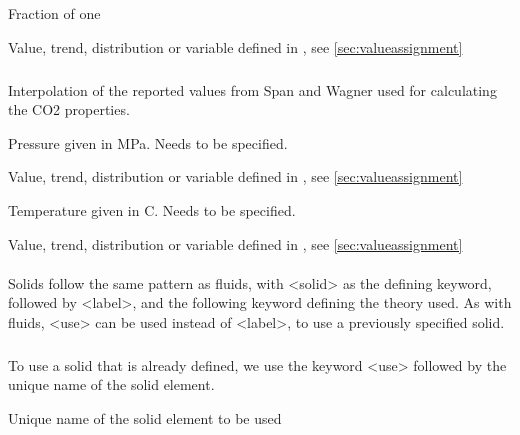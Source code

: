 {
 \slist
   \item \Description Fraction of one
   \item \Argument Value, trend, distribution or variable defined in , see \autoref{sec:valueassignment}
   \item \Default
 \elist

\subparagraph{}
 \slist
   \item \Description Interpolation of the reported values from Span and Wagner used for calculating the CO2 properties.
   \item \Argument
   \item \Default
 \elist

 \slist
   \item \Description Pressure given in MPa. Needs to be specified.
   \item \Argument Value, trend, distribution or variable defined in , see \autoref{sec:valueassignment}
   \item \Default
 \elist

 \slist
   \item \Description Temperature given in C. Needs to be specified.
   \item \Argument Value, trend, distribution or variable defined in , see \autoref{sec:valueassignment}
   \item \Default
 \elist


\paragraph{}
 \slist
   \item \Description Solids follow the same pattern as fluids, with <solid> as the defining keyword, followed by <label>, and the following keyword defining the theory used. As with fluids, <use> can be used instead of <label>, to use a previously specified solid.
   \item \Argument
   \item \Default
 \elist

\subparagraph{}
 \slist
   \item \Description  To use a solid that is already defined, we use the keyword <use> followed by the unique name of the solid element.
   \item \Argument Unique name of the solid element to be used
   \item \Default
 \elist

}
